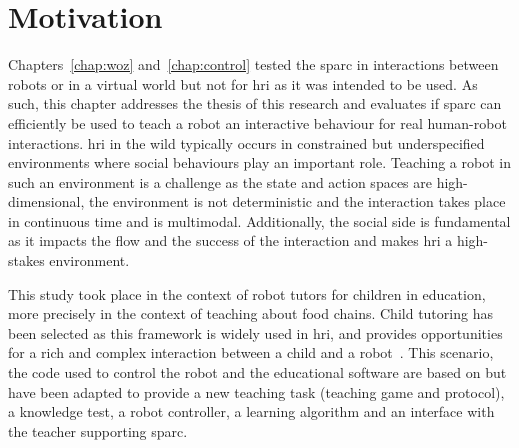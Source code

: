\newpage

\section{Motivation}

Chapters~\ref{chap:woz} and~\ref{chap:control} tested the \gls{sparc} in interactions between robots or in a virtual world but not for \gls{hri} as it was intended to be used. As such, this chapter addresses the thesis of this research and evaluates if \gls{sparc} can efficiently be used to teach a robot an interactive behaviour for real human-robot interactions. \gls{hri} in the wild typically occurs in constrained but underspecified environments where social behaviours play an important role. Teaching a robot in such an environment is a challenge as the state and action spaces are high-dimensional, the environment is not deterministic and the interaction takes place in continuous time and is multimodal. Additionally, the social side is fundamental as it impacts the flow and the success of the interaction and makes \gls{hri} a high-stakes environment.%

This study took place in the context of robot tutors for children in education, more precisely in the context of teaching about food chains. Child tutoring has been selected as this framework is widely used in \gls{hri}, and provides opportunities for a rich and complex interaction between a child and a robot~\citep{leyzberg2012physical,kennedy2015robot}. This scenario, the code used to control the robot and the educational software are based on \cite{lemaignan2017free} but have been adapted to provide a new teaching task (teaching game and protocol), a knowledge test, a robot controller, a learning algorithm and an interface with the teacher supporting \gls{sparc}.


